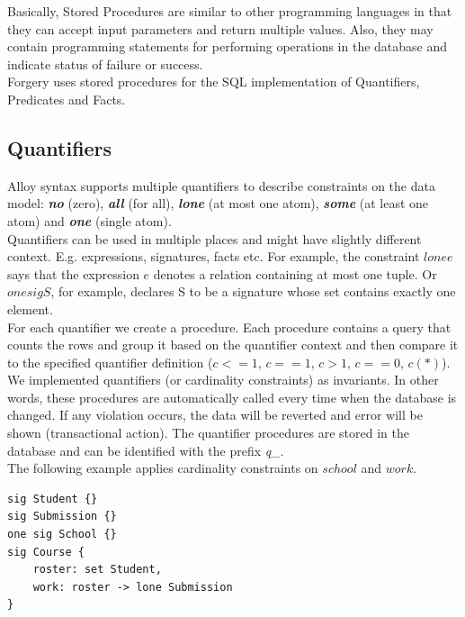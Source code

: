\documentclass[oneside]{book}
\begin{document}
\noindent Basically, Stored Procedures are similar to other programming languages in that they can accept input parameters and return multiple values. Also, they may contain programming statements for performing operations in the database and indicate status of failure or success.\\

\noindent Forgery uses stored procedures for the SQL implementation of Quantifiers, Predicates and Facts.

\subsection{Quantifiers}
\noindent Alloy syntax supports multiple quantifiers to describe constraints on the data model: \textbf{\textit{no}} (zero), \textbf{\textit{all}} (for all), \textbf{\textit{lone}} (at most one atom), \textbf{\textit{some}} (at least one atom) and \textbf{\textit{one}} (single atom).\\

Quantifiers can be used in multiple places and might have slightly different context. E.g. expressions, signatures, facts etc.
For example, the constraint $lone e$ says that the expression $e$ denotes a relation containing at most one tuple. Or $one sig S$, for example, declares S to be a signature whose set contains exactly one element.\\

For each quantifier we create a procedure. Each procedure contains a query that counts the rows and group it based on the quantifier context and then compare it to the specified quantifier definition ($c<=1$, $c==1$, $c>1$, $c==0$, $c(*)$).\\

We implemented quantifiers (or cardinality constraints) as invariants. In other words, these procedures are automatically called every time when the database is changed. If any violation occurs, the data will be reverted and error will be shown (transactional action). The quantifier procedures are stored in the database and can be identified with the prefix \textit{q\_}.\\

The following example applies cardinality constraints on $school$ and $work$.

\begin{lstlisting}
sig Student {}
sig Submission {}
one sig School {}
sig Course {
	roster: set Student,
	work: roster -> lone Submission
}
\end{lstlisting}
\end{document}
